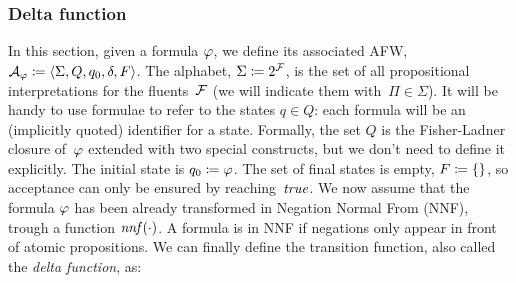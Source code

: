 \subsubsection{Delta function}

In this section, given a \ldl{} formula $\varphi$, we define its associated
AFW, $\mathcal{A}_\varphi \coloneqq \langle \Sigma, Q, q_0, \delta, F
\rangle$. The alphabet, $\Sigma \coloneqq 2^{\mathcal{F}}$, is the set of all
propositional interpretations for the fluents~$\mathcal{F}$ (we will indicate
them with~$\Pi \in \Sigma$). It will be handy to use \ldl{} formulae to refer
to the states $q \in Q$: each formula will be an (implicitly quoted)
identifier for a state. Formally, the set $Q$ is the Fisher-Ladner closure
of~$\varphi$ extended with two special constructs, but we don't need to
define it explicitly. The initial state is $q_0 \coloneqq \varphi$. The set
of final states is empty, $F \coloneqq \{\}$, so acceptance can only be
ensured by reaching~$\text{\textit{true}}$. We now assume that the formula $\varphi$ has
been already transformed in Negation Normal From
(NNF), trough a function
$\text{\textit{nnf}}(\cdot)$. A formula is in NNF if negations only appear in front of
atomic propositions. We can finally define the transition function, also
called the \emph{delta function}, as:
\begingroup
\allowdisplaybreaks
